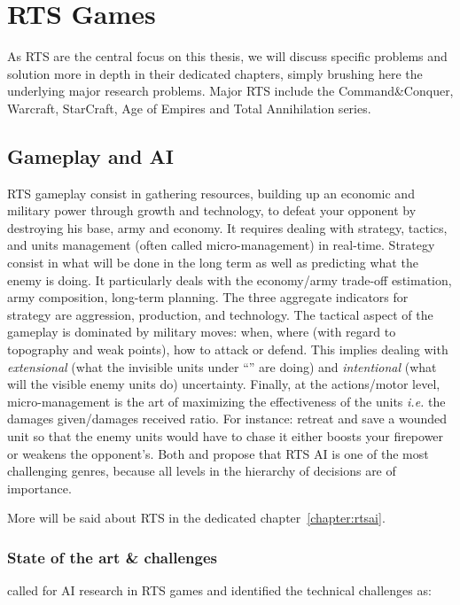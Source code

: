 
\section{RTS Games}
As RTS are the central focus on this thesis, we will discuss specific problems and solution more in depth in their dedicated chapters, simply brushing here the underlying major research problems. Major RTS include the Command\&Conquer, Warcraft, StarCraft, Age of Empires and Total Annihilation series.

\subsection{Gameplay and AI}
RTS gameplay consist in gathering resources, building up an economic and military power through growth and technology, to defeat your opponent by destroying his base, army and economy. It requires dealing with strategy, tactics, and units management (often called micro-management) in real-time. Strategy consist in what will be done in the long term as well as predicting what the enemy is doing. It particularly deals with the economy/army trade-off estimation, army composition, long-term planning. The three aggregate indicators for strategy are aggression, production, and technology. The tactical aspect of the gameplay is dominated by military moves: when, where (with regard to topography and weak points), how to attack or defend. This implies dealing with \textit{extensional} (what the invisible units under ``'' are doing) and \textit{intentional} (what will the visible enemy units do) uncertainty. Finally, at the actions/motor level, micro-management is the art of maximizing the effectiveness of the units \textit{i.e.} the damages given/damages received ratio. For instance: retreat and save a wounded unit so that the enemy units would have to chase it either boosts your firepower or weakens the opponent's. Both \citep{Human-LevelAIKillerApplication} and \cite{gunn} propose that RTS AI is one of the most challenging genres, because all levels in the hierarchy of decisions are of importance.

More will be said about RTS in the dedicated chapter~\ref{chapter:rtsai}.

\subsubsection{State of the art \& challenges}
\citet{Buro04callfor} called for AI research in RTS games and identified the technical challenges as:%

